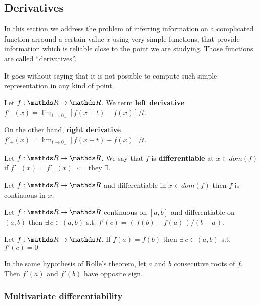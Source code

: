 \documentclass[ComputationalMathematics.tex]{subfiles}
\begin{document}
\subsection{Derivatives}

In this section we address the problem of inferring information on a complicated function arround a certain value $\bar{x}$ using very simple functions, that provide information which is reliable close to the point we are studying.
Those functions are called ``derivatives''.

It goes without saying that it is not possible to compute such simple representation in any kind of point.

\begin{definition}
  Let $f: \R \to \R$. We term \textbf{left derivative} $f'_{-}(x) = \lim_{t \to 0_{-}} [f(x + t) - f(x)] / t$.
  
  On the other hand, \textbf{right derivative} $f'_{+}(x) = \lim_{t \to 0_{+}} [f(x + t) - f(x)] / t$.
\end{definition}

\begin{definition}[Differentiable]
  Let $f:\R \to \R$. We say that $f$ is \textbf{differentiable} at $x \in dom(f)$ if $f'_-(x) = f'_+(x)$ $\Leftarrow$ they $\exists$.
\end{definition}

\begin{proposition}
  Let $f: \R \to \R$ and differentiable in $x \in dom(f)$ then $f$ is continuous in $x$. 
\end{proposition}


\begin{theorem}
Let $f : \R \to \R$ continuous on $[a, b]$ and differentiable on $(a,b)$ then $\exists \, c \in (a, b)$ s.t. $f'(c) = ( \, f(b) - f(a) \, ) / (b - a)$.
\end{theorem}

\begin{theorem}
Let $f: \R \to \R$. If $f(a) = f(b)$ then $\exists~c \in (a, b)$ s.t.~$f'(c) = 0$
\end{theorem}

\begin{corollary}
In the same hypothesis of Rolle's theorem, let $a$ and $b$ consecutive roots of $f$. Then $f'(a)$ and $f'(b)$ have opposite sign.
\end{corollary}

\subsubsection{Multivariate differentiability}
\end{document}
